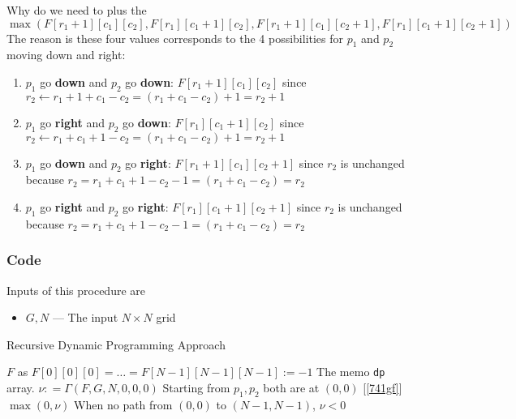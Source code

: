 \documentclass[a4paper,12pt]{article}
\begin{document}
\par
Why do we need to plus the 
\[
\max(F[r_1+1][c_1][c_2], F[r_1][c_1+1][c_2], F[r_1+1][c_1][c_2+1], F[r_1][c_1+1][c_2+1])
\]
The reason is these four values corresponds to the 4 possibilities for $p_1$ and $p_2$ moving down and right:
\begin{enumerate}
\item $p_1$ go \textbf{down} and $p_2$ go \textbf{down}: $F[r_1+1][c_1][c_2]$ since $r_2 \gets r_1 + 1 +c_1 -c_2 = (r_1+c_1-c_2) + 1 = r_2+1$
\item $p_1$ go \textbf{right} and $p_2$ go \textbf{down}: $F[r_1][c_1+1][c_2]$ since $r_2 \gets r_1 + c_1 + 1 -c_2 = (r_1+c_1-c_2) + 1 = r_2+1$
\item $p_1$ go \textbf{down} and $p_2$ go \textbf{right}: $F[r_1+1][c_1][c_2+1]$ since $r_2$ is unchanged because $r_2= r_1 + c_1 + 1 -c_2 - 1 = (r_1+c_1-c_2) = r_2$
\item $p_1$ go \textbf{right} and $p_2$ go \textbf{right}: $F[r_1][c_1+1][c_2+1]$ since $r_2$ is unchanged because $r_2= r_1 + c_1 + 1 -c_2 - 1 = (r_1+c_1-c_2) = r_2$
\end{enumerate}
\subsubsection{Code}
Inputs of this procedure are
\begin{itemize}
\item $G, N$ --- The input $N\times N $ grid
\end{itemize}
\setcounter{algorithm}{0}
\begin{algorithm}[H]
\caption{Recursive Dynamic Programming Approach}
\begin{algorithmic}[1]
\State $F$ as $F[0][0][0] = \ldots = F[N-1][N-1][N-1]:= -1$ \Comment The memo \texttt{dp} array.
\State $\nu: = \Gamma(F, G, N, 0, 0, 0)$ \Comment Starting from $p_1, p_2$ both are at $(0,0)$ [\ref{741gf}]
\State \Return $\max(0, \nu)$ \Comment When no path from $(0,0)$ to $(N-1, N-1)$, $\nu < 0$
\EndProcedure
\end{algorithmic}
\end{algorithm}
\end{document}
